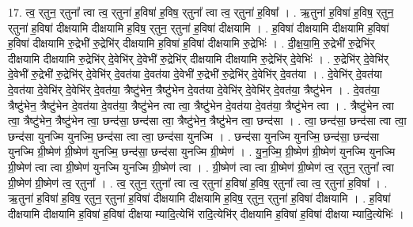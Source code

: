 \documentclass[17pt]{extarticle}
\begin{document}
17. त्व॒ र्‌तुन॒ र्‌तुना᳚ त्वा त्व॒ र्‌तुना॑ ह॒विषा॑ ह॒विष॒ र्‌तुना᳚ त्वा त्व॒ र्‌तुना॑ ह॒विषा᳚ । . ऋ॒तुना॑ ह॒विषा॑ ह॒विष॒ र्‌तुन॒ र्‌तुना॑ ह॒विषा॑ दीक्षयामि दीक्षयामि ह॒विष॒ र्‌तुन॒ र्‌तुना॑ ह॒विषा॑ दीक्षयामि । . ह॒विषा॑ दीक्षयामि दीक्षयामि ह॒विषा॑ ह॒विषा॑ दीक्षयामि रु॒द्रेभी॑ रु॒द्रेभि॑र् दीक्षयामि ह॒विषा॑ ह॒विषा॑ दीक्षयामि रु॒द्रेभिः॑ । . दी॒क्ष॒या॒मि॒ रु॒द्रेभी॑ रु॒द्रेभि॑र् दीक्षयामि दीक्षयामि रु॒द्रेभि॑र् दे॒वेभि॑र् दे॒वेभी॑ रु॒द्रेभि॑र् दीक्षयामि दीक्षयामि रु॒द्रेभि॑र् दे॒वेभिः॑ । . रु॒द्रेभि॑र् दे॒वेभि॑र् दे॒वेभी॑ रु॒द्रेभी॑ रु॒द्रेभि॑र् दे॒वेभि॑र् दे॒वत॑या दे॒वत॑या दे॒वेभी॑ रु॒द्रेभी॑ रु॒द्रेभि॑र् दे॒वेभि॑र् दे॒वत॑या । . दे॒वेभि॑र् दे॒वत॑या दे॒वत॑या दे॒वेभि॑र् दे॒वेभि॑र् दे॒वत॑या॒ त्रैष्टु॑भेन॒ त्रैष्टु॑भेन दे॒वत॑या दे॒वेभि॑र् दे॒वेभि॑र् दे॒वत॑या॒ त्रैष्टु॑भेन । . दे॒वत॑या॒ त्रैष्टु॑भेन॒ त्रैष्टु॑भेन दे॒वत॑या दे॒वत॑या॒ त्रैष्टु॑भेन त्वा त्वा॒ त्रैष्टु॑भेन दे॒वत॑या दे॒वत॑या॒ त्रैष्टु॑भेन त्वा । . त्रैष्टु॑भेन त्वा त्वा॒ त्रैष्टु॑भेन॒ त्रैष्टु॑भेन त्वा॒ छन्द॑सा॒ छन्द॑सा त्वा॒ त्रैष्टु॑भेन॒ त्रैष्टु॑भेन त्वा॒ छन्द॑सा । . त्वा॒ छन्द॑सा॒ छन्द॑सा त्वा त्वा॒ छन्द॑सा युनज्मि युनज्मि॒ छन्द॑सा त्वा त्वा॒ छन्द॑सा युनज्मि । . छन्द॑सा युनज्मि युनज्मि॒ छन्द॑सा॒ छन्द॑सा युनज्मि ग्री॒ष्मेण॑ ग्री॒ष्मेण॑ युनज्मि॒ छन्द॑सा॒ छन्द॑सा युनज्मि ग्री॒ष्मेण॑ । . यु॒न॒ज्मि॒ ग्री॒ष्मेण॑ ग्री॒ष्मेण॑ युनज्मि युनज्मि ग्री॒ष्मेण॑ त्वा त्वा ग्री॒ष्मेण॑ युनज्मि युनज्मि ग्री॒ष्मेण॑ त्वा । . ग्री॒ष्मेण॑ त्वा त्वा ग्री॒ष्मेण॑ ग्री॒ष्मेण॑ त्व॒ र्‌तुन॒ र्‌तुना᳚ त्वा ग्री॒ष्मेण॑ ग्री॒ष्मेण॑ त्व॒ र्‌तुना᳚ । . त्व॒ र्‌तुन॒ र्‌तुना᳚ त्वा त्व॒ र्‌तुना॑ ह॒विषा॑ ह॒विष॒ र्‌तुना᳚ त्वा त्व॒ र्‌तुना॑ ह॒विषा᳚ । . ऋ॒तुना॑ ह॒विषा॑ ह॒विष॒ र्‌तुन॒ र्‌तुना॑ ह॒विषा॑ दीक्षयामि दीक्षयामि ह॒विष॒ र्‌तुन॒ र्‌तुना॑ ह॒विषा॑ दीक्षयामि । . ह॒विषा॑ दीक्षयामि दीक्षयामि ह॒विषा॑ ह॒विषा॑ दीक्षया म्यादि॒त्येभि॑ रादि॒त्येभि॑र् दीक्षयामि ह॒विषा॑ ह॒विषा॑ दीक्षया म्यादि॒त्येभिः॑ । \newline
\end{document}
